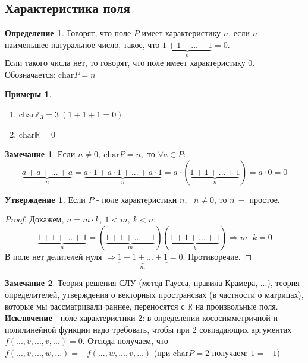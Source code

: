 \documentclass[a4paper, 12pt]{article}
\newcommand{\R}{\mathbb R}
\newcommand{\Z}{\mathbb Z}
\newcommand\tab[1][.5cm]{\hspace*{#1}}
\theoremstyle{definition}
\newtheorem*{definition}{Определение}
\newtheorem*{subtheorem}{Утверждение}
\newtheorem*{remark}{Замечание}
\newtheorem*{example}{Примеры}
\begin{document}
  \subsection{Характеристика поля}
  \begin{definition}
    Говорят, что поле $P$ имеет характеристику $n$, если $n$ - наименьшее натуральное число, такое, что $\underbrace{1 + 1 + ... + 1}_{n} = 0 $. \\
    Если такого числа нет, то говорят, что поле имеет характеристику 0.\\
    Обозначается: $\textrm{char}P=n$ 
  \end{definition} 
  \begin{example} \tab
    \begin{enumerate}
      \item $\textrm{char}\Z_3 = 3 \ (1 + 1 + 1 = 0)$
      \item $\textrm{char}\R = 0$  
    \end{enumerate}
  \end{example}
  \begin{remark}
    Если $n \neq 0, \ \textrm{char}P = n, $ то $\forall a \in P:$ 
    $$ \underbrace{a+a+...+a}_{n} = \underbrace{a\cdot 1+a\cdot 1+...+a\cdot 1}_{n} = a\cdot (\underbrace{1+1+...+1}_{n}) = a \cdot 0 =0 $$ 
  \end{remark} 
  \begin{subtheorem}
    Если $P$ - поле характеристики $n$, \ $n \neq 0$, то $n \ -$ простое. 
  \end{subtheorem} 
  \begin{proof}
    Докажем, $n=m\cdot k, \ 1<m, \ k<n$:
    $$\underbrace{1+1+...+1}_{n} = (\underbrace{1+1+...+1}_{m})(\underbrace{1+1+...+1}_{k})\Longrightarrow m \cdot k=0$$  
    В поле нет делителей нуля $\Longrightarrow \underbrace{1+1+...+1}_{m} = 0$. Противоречие.
  \end{proof}
  \begin{remark}
    Теория решения СЛУ (метод Гаусса, правила Крамера, ...), теория определителей, утверждения о векторных пространсвах (в частности о матрицах), которые мы рассматривали раннее, переносятся с $\R$ на произвольные поля. \\
    \textbf{Исключение}  - поле характеристики 2: в определении кососимметричной и полилинейной функции надо требовать, чтобы при 2 совпадающих аргументах \\ $f(...,v,...,v,...)=0$. Отсюда получаем, что $f(...,v,...,w,...) = -f(...,w,...,v,...)$ (при $\textrm{char}P = 2$ получаем: $1 = -1$)  
  \end{remark}
\end{document}
